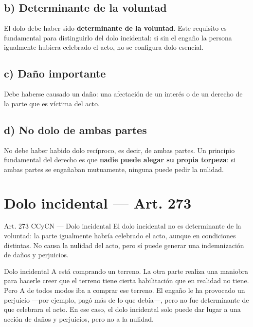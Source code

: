\documentclass[12pt,oneside]{book}
\begin{document}
\subsection*{b) Determinante de la voluntad}

El dolo debe haber sido \textbf{determinante de la voluntad}. Este requisito es fundamental para distinguirlo del dolo incidental: si sin el engaño la persona igualmente hubiera celebrado el acto, no se configura dolo esencial.

\subsection*{c) Daño importante}

Debe haberse causado un daño: una afectación de un interés o de un derecho de la parte que es víctima del acto.

\subsection*{d) No dolo de ambas partes}

No debe haber habido dolo recíproco, es decir, de ambas partes. Un principio fundamental del derecho es que \textbf{nadie puede alegar su propia torpeza}: si ambas partes se engañaban mutuamente, ninguna puede pedir la nulidad.

\section{Dolo incidental --- Art. 273}

\begin{articulo}{Art. 273 CCyCN --- Dolo incidental}
El dolo incidental no es determinante de la voluntad: la parte igualmente habría celebrado el acto, aunque en condiciones distintas. No causa la nulidad del acto, pero sí puede generar una indemnización de daños y perjuicios.
\end{articulo}

\begin{example}{Dolo incidental}
A está comprando un terreno. La otra parte realiza una maniobra para hacerle creer que el terreno tiene cierta habilitación que en realidad no tiene. Pero A de todos modos iba a comprar ese terreno. El engaño le ha provocado un perjuicio ---por ejemplo, pagó más de lo que debía---, pero no fue determinante de que celebrara el acto. En ese caso, el dolo incidental solo puede dar lugar a una acción de daños y perjuicios, pero no a la nulidad.
\end{example}
\end{document}
